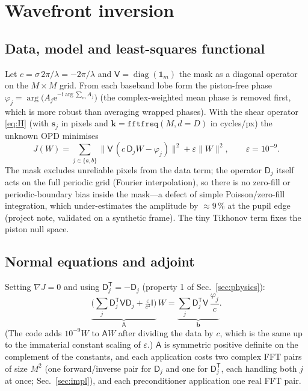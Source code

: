 \documentclass[11pt,a4paper]{article}
\theoremstyle{definition}
\newcommand{\vk}{\bm{k}}
\newcommand{\vs}{\bm{s}}
\newcommand{\ii}{\mathrm{i}}
\newcommand{\ee}{\mathrm{e}}
\newcommand{\Dop}{\mathsf{D}}
\newcommand{\Vop}{\mathsf{V}}
\newcommand{\Aop}{\mathsf{A}}
\begin{document}
\section{Wavefront inversion}
\label{sec:inversion}
\subsection{Data, model and least-squares functional}
Let $c=\sigma\,2\pi/\lambda=-2\pi/\lambda$ and $\Vop=\operatorname{diag}(\mathbb 1_m)$ the mask as a diagonal operator on the $M\times M$ grid.
From each baseband lobe form the piston-free phase $\varphi_j=\arg\!\big(A_j\ee^{-\ii\arg\sum_{m}A_j}\big)$ (the complex-weighted mean phase is removed first, which is more robust than averaging wrapped phases). With the shear operator
\eqref{eq:H} (with $\vs_j$ in pixels and $\vk=\texttt{fftfreq}(M,d{=}D)$ in cycles/px) the unknown OPD minimises
\begin{equation}
J(W)=\sum_{j\in\{a,b\}}\big\|\Vop\,(c\,\Dop_jW-\varphi_j)\big\|^2+\varepsilon\|W\|^2,\qquad \varepsilon=10^{-9}.
\label{eq:J}
\end{equation}
The mask excludes unreliable pixels from the data term; the operator $\Dop_j$ itself acts on the full periodic grid (Fourier interpolation), so there is no zero-fill or periodic-boundary bias
inside the mask---a defect of simple Poisson/zero-fill integration, which under-estimates the amplitude by $\approx9\,\%$ at the pupil edge (project note, validated on a synthetic frame).
The tiny Tikhonov term fixes the piston null space.

\subsection{Normal equations and adjoint}
Setting $\nabla J=0$ and using $\Dop_j^{\mathsf T}=-\Dop_j$ (property 1 of Sec.~\ref{sec:physics}):
\begin{equation}
\underbrace{\Big(\sum_j\Dop_j^{\mathsf T}\Vop\Dop_j+\tfrac{\varepsilon}{c^2}\mathsf I\Big)}_{\Aop}\,W=\underbrace{\sum_j\Dop_j^{\mathsf T}\Vop\,\frac{\varphi_j}{c}}_{\bm b}.
\label{eq:normal}
\end{equation}
(The code adds $10^{-9}W$ to $\Aop W$ after dividing the data by $c$, which is the same up to the immaterial constant scaling of $\varepsilon$.)
$\Aop$ is symmetric positive definite on the complement of the constants, and each application costs two complex FFT pairs of size $M^2$ (one forward/inverse pair for $\Dop_j$ and one for $\Dop_j^{\mathsf T}$, each handling both $j$ at once; Sec.~\ref{sec:impl}), and each preconditioner application one real FFT pair.
\end{document}
